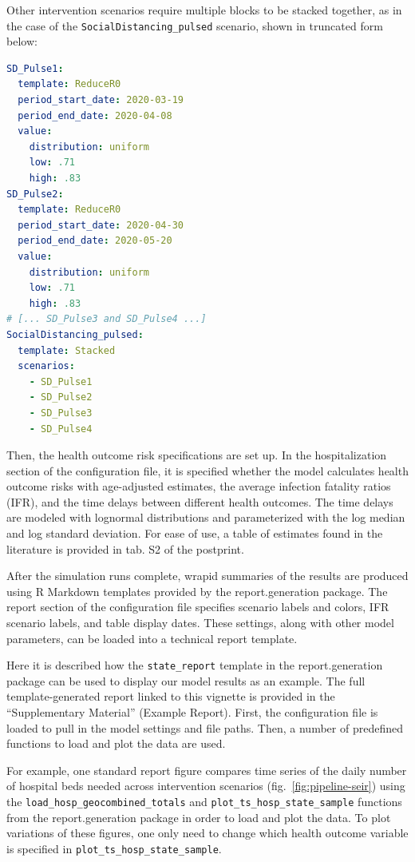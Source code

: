 {Other intervention scenarios require multiple blocks to be stacked together, as in the case of the \verb|SocialDistancing_pulsed| scenario, shown in truncated form below: 

\begin{lstlisting}[language=yaml]
SD_Pulse1: 
  template: ReduceR0 
  period_start_date: 2020-03-19 
  period_end_date: 2020-04-08 
  value: 
    distribution: uniform 
    low: .71 
    high: .83 
SD_Pulse2: 
  template: ReduceR0 
  period_start_date: 2020-04-30 
  period_end_date: 2020-05-20 
  value: 
    distribution: uniform
    low: .71 
    high: .83 
# [... SD_Pulse3 and SD_Pulse4 ...]
SocialDistancing_pulsed: 
  template: Stacked 
  scenarios: 
    - SD_Pulse1 
    - SD_Pulse2
    - SD_Pulse3
    - SD_Pulse4
\end{lstlisting}

Then, the health outcome risk specifications are set up. In the hospitalization section of the configuration file, it is specified whether the model calculates health outcome risks with age-adjusted estimates, the average infection fatality ratios (IFR), and the time delays between different health outcomes. The time delays are modeled with lognormal distributions and parameterized with the log median and log standard deviation. For ease of use, a table of estimates found in the literature is provided in tab. S2 of the postprint.

After the simulation runs complete, wrapid summaries of the results are produced using R Markdown templates provided by the report.generation package. The report section of the configuration file specifies scenario labels and colors, IFR scenario labels, and table display dates. These settings, along with other model parameters, can be loaded into a technical report template.

Here it is described how the \verb|state_report| template in the report.generation package can be used to display our model results as an example. The full template-generated report linked to this vignette is provided in the “Supplementary Material” (Example Report). First, the configuration file is loaded to pull in the model settings and file paths. Then, a number of predefined functions to load and plot the data are used.

For example, one standard report figure compares time series of the daily number of hospital beds needed across intervention scenarios (fig.~\ref{fig:pipeline-seir}) using the \verb|load_hosp_geocombined_totals| and \verb|plot_ts_hosp_state_sample| functions from the report.generation package in order to load and plot the data. To plot variations of these figures, one only need to change which health outcome variable is specified in \verb|plot_ts_hosp_state_sample|.

}
